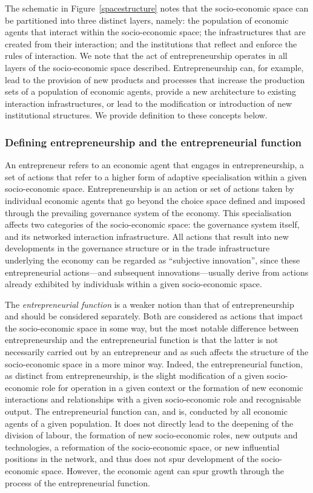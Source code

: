 The schematic in Figure~\ref{spacestructure} notes that the socio-economic space can be partitioned into three distinct layers, namely: the population of economic agents that interact within the socio-economic space; the infrastructures that are created from their interaction; and the institutions that reflect and enforce the rules of interaction. We note that the act of entrepreneurship operates in all layers of the socio-economic space described. Entrepreneurship can, for example, lead to the provision of new products and processes that increase the production sets of a population of economic agents, provide a new architecture to existing interaction infrastructures, or lead to the modification or introduction of new institutional structures. We provide definition to these concepts below.

\subsubsection{Defining entrepreneurship and the entrepreneurial function}
\label{definingentrepreneurship}

An entrepreneur refers to an economic agent that engages in entrepreneurship, a set of actions that refer to a higher form of adaptive specialisation within a given socio-economic space.  Entrepreneurship is an action or set of actions taken by individual economic agents that go beyond the choice space defined and imposed through the prevailing governance system of the economy. This specialisation affects two categories of the socio-economic space: the governance system itself, and its networked interaction infrastructure. All actions that result into new developments in the governance structure or in the trade infrastructure underlying the economy can be regarded as ``subjective innovation'', since these entrepreneurial actions---and subsequent innovations---usually derive from actions already exhibited by individuals within a given socio-economic space.

The \emph{entrepreneurial function} is a weaker notion than that of entrepreneurship and should be considered separately. Both are considered as actions that impact the socio-economic space in some way, but the most notable difference between entrepreneurship and the entrepreneurial function is that the latter is not necessarily carried out by an entrepreneur and as such affects the structure of the socio-economic space in a more minor way. Indeed, the entrepreneurial function, as distinct from entrepreneurship, is the slight modification of a given socio-economic role for operation in a given context or the formation of new economic interactions and relationships with a given socio-economic role and recognisable output. The entrepreneurial function can, and is, conducted by all economic agents of a given population. It does not directly lead to the deepening of the division of labour, the formation of new socio-economic roles, new outputs and technologies, a reformation of the socio-economic space, or new influential positions in the network, and thus does not spur development of the socio-economic space. However, the economic agent can spur growth through the process of the entrepreneurial function.


